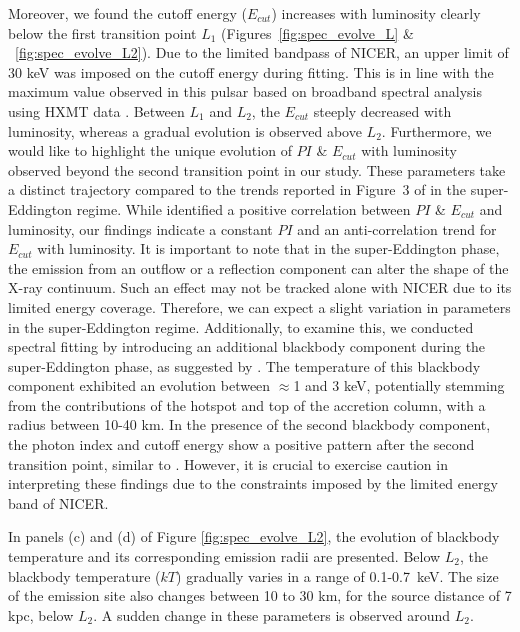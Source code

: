 \documentclass[twocolumn,trackchanges]{aastex631}
\begin{document}
Moreover, we found the cutoff energy ($E_{cut}$)  increases with luminosity clearly below the first transition point $L_{1}$ (Figures~\ref{fig:spec_evolve_L} \& ~\ref{fig:spec_evolve_L2}). Due to the limited bandpass of NICER, an upper limit of 30 keV was imposed on the cutoff energy during fitting. This is in line with the maximum value observed in this pulsar based on broadband spectral analysis using HXMT data \citep{2020ApJ...902...18K}.  Between $L_{1}$ and $L_{2}$, the $E_{cut}$ steeply decreased with luminosity, whereas a gradual evolution is observed above $L_{2}$. Furthermore, we would like to highlight the unique evolution of $PI$ \& $E_{cut}$ with luminosity observed beyond the second transition point in our study. These parameters take a distinct trajectory compared to the trends reported in Figure~3 of \citet{2020ApJ...902...18K} in the super-Eddington regime. 
While \citet{2020ApJ...902...18K} identified a positive correlation between $PI$ \& $E_{cut}$ and luminosity, our findings indicate a constant $PI$ and an anti-correlation trend for $E_{cut}$ with luminosity. It is important to note that in the super-Eddington phase, the emission from an outflow or a reflection component can alter the shape of the X-ray continuum. Such an effect may not be tracked alone with NICER due to its limited energy coverage. 
Therefore, we can expect a slight variation in parameters in the super-Eddington regime. Additionally, to examine this, we conducted spectral fitting by introducing an additional blackbody component during the super-Eddington phase, as suggested by \citet{2019ApJ...873...19T}. The temperature of this blackbody component exhibited an evolution between $\approx$1  and 3 keV, potentially stemming from the contributions of the hotspot and top of the accretion column, with a radius between 10-40 km. In the presence of the second blackbody component, the photon index and cutoff energy show a positive pattern after the second transition point, similar to  \citet{2020ApJ...902...18K}. However, it is crucial to exercise caution in interpreting these findings due to the constraints imposed by the limited energy band of NICER. 



In panels (c) and (d) of Figure \ref{fig:spec_evolve_L2}, the evolution of blackbody temperature and its corresponding emission radii are presented. Below $L_{2}$, the blackbody temperature ($kT$) gradually varies in a range of 0.1-0.7~keV. The size of the emission site also changes between 10 to 30 km, for the source distance of 7 kpc, below $L_{2}$. A sudden change in these parameters is observed around $L_{2}$. 
\end{document}
